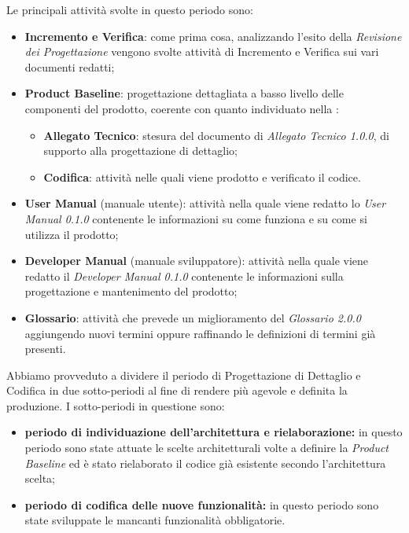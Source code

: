 Le principali attività svolte in questo periodo sono:
\begin{itemize}
	\item \textbf{Incremento e Verifica}: come prima cosa, analizzando l'esito della \textit{Revisione dei Progettazione} vengono svolte attività di Incremento e Verifica sui vari documenti redatti;
	\item \textbf{Product Baseline}: progettazione dettagliata a basso livello delle componenti del prodotto, coerente con quanto individuato nella \TB{}:
	\begin{itemize}
		\item \textbf{Allegato Tecnico}: stesura del documento di \textit{Allegato Tecnico 1.0.0}, di supporto alla progettazione di dettaglio;
		\item \textbf{Codifica}: attività nelle quali viene prodotto e verificato il codice.
	\end{itemize}
	\item \textbf{User Manual} (manuale utente): attività nella quale viene redatto lo \textit{User Manual 0.1.0} contenente le informazioni su come funziona e su come si utilizza il prodotto;
	\item \textbf{Developer Manual} (manuale sviluppatore): attività nella quale viene redatto il \textit{Developer Manual 0.1.0} contenente le informazioni sulla progettazione e mantenimento del prodotto;
	\item \textbf{Glossario}: attività che prevede un miglioramento del \textit{Glossario 2.0.0} aggiungendo nuovi termini oppure raffinando le definizioni di termini già presenti.
\end{itemize}

Abbiamo provveduto a dividere il periodo di Progettazione di Dettaglio e Codifica in due sotto-periodi al fine di rendere più agevole e definita la produzione. I sotto-periodi in questione sono:
\begin{itemize}
	\item \textbf{periodo di individuazione dell'architettura e rielaborazione:} in questo periodo sono state attuate le scelte architetturali volte a definire la \textit{Product Baseline} ed è stato rielaborato il codice già esistente secondo l'architettura scelta;
	\item \textbf{periodo di codifica delle nuove funzionalità:} in questo periodo sono state sviluppate le mancanti funzionalità obbligatorie.
\end{itemize}

